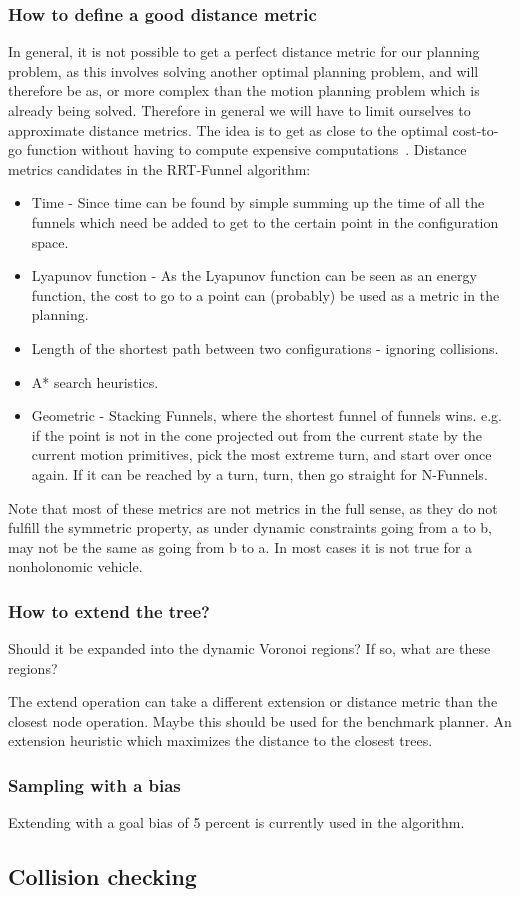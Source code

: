 \subsubsection{How to define a good distance metric}
In general, it is not possible to get a perfect distance metric for our planning
problem, as this involves solving another optimal planning problem, and will
therefore be as, or more complex than the motion planning problem which is
already being solved. Therefore in general we will have to limit ourselves to
approximate distance metrics. The idea is to get as close to the optimal
cost-to-go function without having to compute expensive
computations~\cite{Lav06}. Distance metrics candidates in the RRT-Funnel
algorithm:
\begin{itemize}
\item Time - Since time can be found by simple summing up the time of all the
  funnels which need be added to get to the certain point in the configuration
  space.
\item Lyapunov function - As the Lyapunov function can be seen as an energy
  function, the cost to go to a point can (probably) be used as a metric in the
  planning.
\item Length of the shortest path between two configurations - ignoring
  collisions.
\item A* search heuristics.
\item Geometric - Stacking Funnels, where the shortest funnel of funnels wins.
  e.g. if the point is not in the cone projected out from the current state by
  the current motion primitives, pick the most extreme turn, and start over once
  again. If it can be reached by a turn, turn, then go straight for N-Funnels.
\end{itemize}

Note that most of these metrics are not metrics in the full sense, as they do
not fulfill the symmetric property, as under dynamic constraints going from a to
b, may not be the same as going from b to a. In most cases it is not true for a
nonholonomic vehicle.

\subsubsection{How to extend the tree?}

Should it be expanded into the dynamic Voronoi regions? If so, what are these
regions?

The extend operation can take a different extension or distance metric than the
closest node operation. Maybe this should be used for the benchmark planner. An
extension heuristic which maximizes the distance to the closest trees.

\subsubsection{Sampling with a bias}

Extending with a goal bias of 5 percent is currently used in the \rrtfunnel{}
algorithm. 

\subsection{Collision checking}
